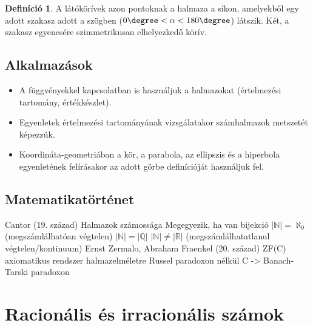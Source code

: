 \documentclass[twoside,12pt]{report}
\theoremstyle{definition}
\newtheorem{definition}[theorem]{Definíció}
\begin{document}
	\begin{definition}
		A látókörívek azon pontoknak a halmaza a síkon, amelyekből egy adott szakasz adott a szögben ($0\degree < \alpha < 180\degree$) látszik. Két, a szakasz egyenesére szimmetrikusan elhelyezkedő körív.
	\end{definition}
\section{Alkalmazások}
	\begin{itemize}
		\item A függvényekkel kapcsolatban is használjuk a halmazokat (értelmezési tartomány, értékkészlet).
		\item Egyenletek értelmezési tartományának vizsgálatakor számhalmazok metszetét képezzük.
		\item Koordináta-geometriában a kör, a parabola, az ellipszis és a hiperbola egyenletének felírásakor az adott görbe definícióját használjuk fel.
	\end{itemize}
\section{Matematikatörténet}
	\begin{outline}
		\1 Cantor (19. század)
			\2 Halmazok számossága
				\3 Megegyezik, ha van bijekció
			\2 $|\mathbb{N}|=\aleph_0$ (megszámlálhatóan végtelen)
			\2 $|\mathbb{N}|=|\mathbb{Q}|$
			\2 $|\mathbb{N}|\ne|\mathbb{R}|$ (megszámlálhatatlanul végtelen/kontinuum)
		\1 Ernst Zermalo, Abraham Fraenkel (20. század)
			\2 ZF(C) axiomatikus rendszer halmazelméletre Russel paradoxon nélkül
			\2 C -> Banach-Tarski paradoxon
	\end{outline}
\chapter{Racionális és irracionális számok}
\end{document}
